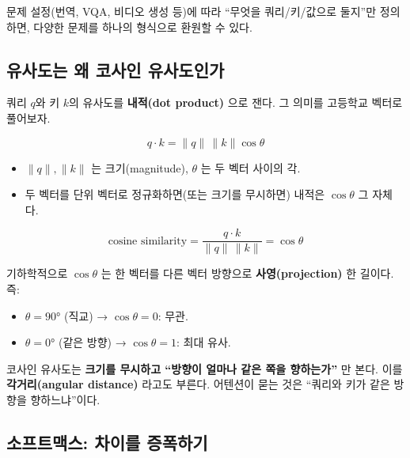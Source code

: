 \documentclass[
  korean,
]{article}
\providecommand{\tightlist}{%
  \setlength{\itemsep}{0pt}\setlength{\parskip}{0pt}}
\begin{document}
문제 설정(번역, VQA, 비디오 생성 등)에 따라 ``무엇을 쿼리/키/값으로
둘지''만 정의하면, 다양한 문제를 하나의 형식으로 환원할 수 있다.

\subsection{유사도는 왜 코사인 유사도인가}\label{sec-cosine}

쿼리 \(q\)와 키 \(k\)의 유사도를 \textbf{내적(dot product)} 으로 잰다.
그 의미를 고등학교 벡터로 풀어보자.

\[
q \cdot k = \|q\|\,\|k\|\cos\theta
\]

\begin{itemize}
\tightlist
\item
  \(\|q\|,\|k\|\) 는 크기(magnitude), \(\theta\) 는 두 벡터 사이의 각.
\item
  두 벡터를 단위 벡터로 정규화하면(또는 크기를 무시하면) 내적은
  \(\cos\theta\) 그 자체다.
\end{itemize}

\[
\text{cosine similarity} = \frac{q\cdot k}{\|q\|\,\|k\|} = \cos\theta
\]

기하학적으로 \(\cos\theta\) 는 한 벡터를 다른 벡터 방향으로
\textbf{사영(projection)} 한 길이다. 즉:

\begin{itemize}
\tightlist
\item
  \(\theta = 90°\) (직교) → \(\cos\theta = 0\): 무관.
\item
  \(\theta = 0°\) (같은 방향) → \(\cos\theta = 1\): 최대 유사.
\end{itemize}

\begin{tcolorbox}[enhanced jigsaw, arc=.35mm, bottomrule=.15mm, bottomtitle=1mm, breakable, colback=white, colbacktitle=quarto-callout-tip-color!10!white, colframe=quarto-callout-tip-color-frame, coltitle=black, left=2mm, leftrule=.75mm, opacityback=0, opacitybacktitle=0.6, rightrule=.15mm, title=\textcolor{quarto-callout-tip-color}{\faLightbulb}\hspace{0.5em}{직관}, titlerule=0mm, toprule=.15mm, toptitle=1mm]

코사인 유사도는 \textbf{크기를 무시하고 ``방향이 얼마나 같은 쪽을
향하는가''} 만 본다. 이를 \textbf{각거리(angular distance)} 라고도
부른다. 어텐션이 묻는 것은 ``쿼리와 키가 같은 방향을 향하느냐''이다.

\end{tcolorbox}

\subsection{소프트맥스: 차이를
증폭하기}\label{uxc18cuxd504uxd2b8uxb9e5uxc2a4-uxcc28uxc774uxb97c-uxc99duxd3eduxd558uxae30}
\end{document}
